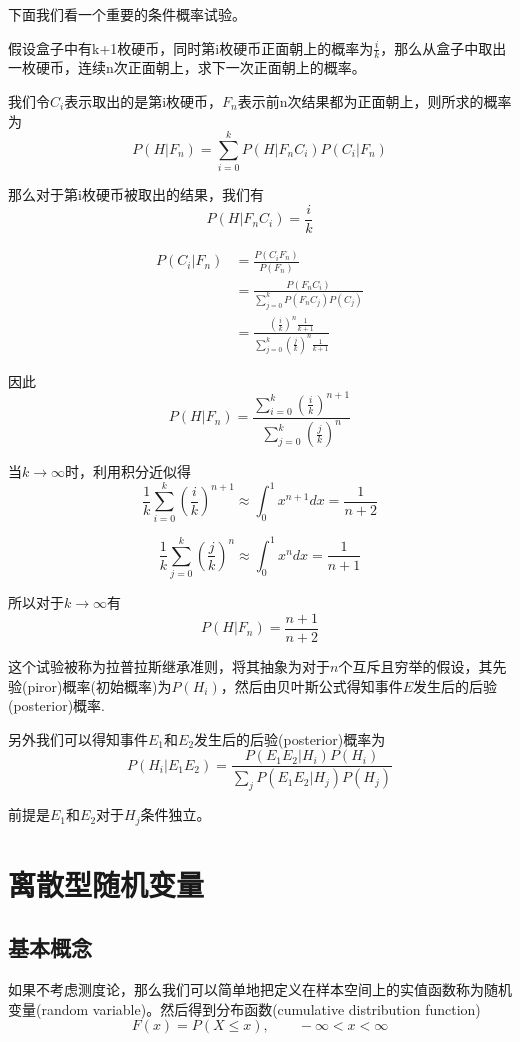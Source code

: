 \documentclass[UTF8]{ctexart}
\begin{document}
下面我们看一个重要的条件概率试验。

假设盒子中有k+1枚硬币，同时第i枚硬币正面朝上的概率为$\frac{i}{k}$，那么从盒子中取出一枚硬币，连续n次正面朝上，求下一次正面朝上的概率。

我们令$C_{i}$表示取出的是第i枚硬币，$F_{n}$表示前n次结果都为正面朝上，则所求的概率为
$$P(H|F_{n})=\sum_{i=0}^{k}P(H|F_{n}C_{i})P(C_{i}|F_{n})$$

那么对于第i枚硬币被取出的结果，我们有
$$P(H|F_{n}C_{i})=\frac{i}{k}$$

$$\begin{aligned}
P(C_{i}|F_{n})&=\frac{P(C_{i}F_{n})}{P(F_{n})}\\
&=\frac{P(F_{n}C_{i})}{\sum\limits_{j=0}^{k}P(F_{n}C_{j})P(C_{j})}\\
&=\frac{(\frac{i}{k})^{n}\frac{1}{k+1}}{\sum\limits_{j=0}^{k}(\frac{j}{k})^{n}\frac{1}{k+1}}
\end{aligned}$$

因此
$$P(H|F_{n})=\frac{\sum\limits_{i=0}^{k}(\frac{i}{k})^{n+1}}{\sum\limits_{j=0}^{k}(\frac{j}{k})^{n}}$$

当$k\to \infty$时，利用积分近似得
$$\frac{1}{k}\sum\limits_{i=0}^{k}(\frac{i}{k})^{n+1}\approx \int_{0}^{1}x^{n+1}dx=\frac{1}{n+2}$$

$$\frac{1}{k}\sum\limits_{j=0}^{k}(\frac{j}{k})^{n}\approx \int_{0}^{1}x^{n}dx=\frac{1}{n+1}$$

所以对于$k\to \infty$有
$$P(H|F_{n})=\frac{n+1}{n+2}$$

这个试验被称为拉普拉斯继承准则，将其抽象为对于$n$个互斥且穷举的假设，其先验(piror)概率(初始概率)为$P(H_{i})$，然后由贝叶斯公式得知事件$E$发生后的后验(posterior)概率.

另外我们可以得知事件$E_{1}$和$E_{2}$发生后的后验(posterior)概率为
$$P(H_{i}|E_{1}E_{2})=\frac{P(E_{1}E_{2}|H_{i})P(H_{i})}{\sum\limits_{j}P(E_{1}E_{2}|H_{j})P(H_{j})}$$

前提是$E_{1}$和$E_{2}$对于$H_{j}$条件独立。

\newpage

\section{离散型随机变量}

\subsection{基本概念}

如果不考虑测度论，那么我们可以简单地把定义在样本空间上的实值函数称为随机变量(random variable)。然后得到分布函数(cumulative distribution function)
$$F(x)=P(X\leq x),\qquad -\infty <x<\infty $$
\end{document}
